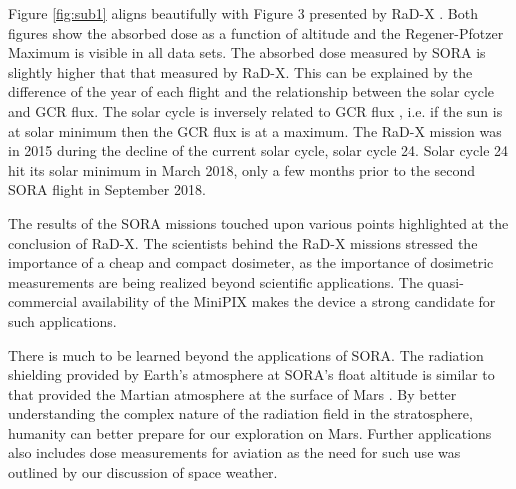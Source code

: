 Figure \ref{fig:sub1} aligns beautifully with Figure 3 presented by RaD-X \cite{rad-x}. Both figures show the absorbed dose as a function of altitude and the Regener-Pfotzer Maximum is visible in all data sets. The absorbed dose measured by SORA is slightly higher that that measured by RaD-X. This can be explained by the difference of the year of each flight and the relationship between the solar cycle and GCR flux. The solar cycle is inversely related to GCR flux \cite{hathaway}, i.e. if the sun is at solar minimum then the GCR flux is at a maximum. The RaD-X mission was in 2015 during the decline of the current solar cycle, solar cycle \num{24}. Solar cycle \num{24} hit its solar minimum in March 2018, only a few months prior to the second SORA flight in September 2018. 

The results of the SORA missions touched upon various points highlighted at the conclusion of RaD-X. The scientists behind the RaD-X missions stressed the importance of a cheap and compact dosimeter, as the importance of dosimetric measurements are being realized beyond scientific applications. The quasi-commercial availability of the MiniPIX makes the device a strong candidate for such applications.

There is much to be learned beyond the applications of SORA. The radiation shielding provided by Earth's atmosphere at SORA's float altitude is similar to that provided the Martian atmosphere at the surface of Mars \cite{rad-x}. By better understanding the complex nature of the radiation field in the stratosphere, humanity can better prepare for our exploration on Mars. Further applications also includes dose measurements for aviation as the need for such use was outlined by our discussion of space weather.



